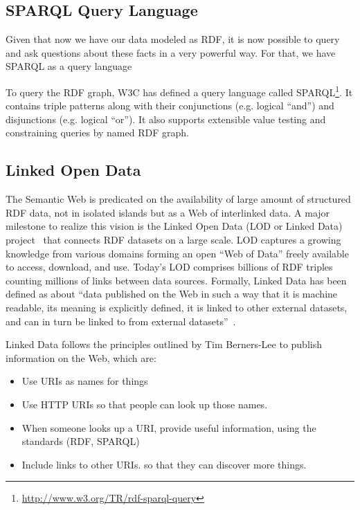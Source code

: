 \subsection{SPARQL Query Language}

Given that now we have our data modeled as RDF, it is now possible to query and ask questions about these facts in a very powerful way. For that, we have SPARQL as a query language

To query the RDF graph, W3C has defined a query language called SPARQL\footnote{\url{http://www.w3.org/TR/rdf-sparql-query}}. It contains triple patterns along with their conjunctions (e.g. logical ``and'') and disjunctions (e.g. logical ``or''). It also supports extensible value testing and constraining queries by named RDF graph.


\subsection{Linked Open Data}

The Semantic Web is predicated on the availability of large amount of structured RDF data, not in isolated islands but as a Web of interlinked data. A major milestone to realize this vision is the Linked Open Data (LOD or Linked Data) project~\cite{LOD:2011} that connects RDF datasets on a large scale. LOD captures a growing knowledge from various domains forming an open ``Web of Data'' freely available to access, download, and use. Today's LOD comprises billions of RDF triples counting millions of links between data sources. Formally, Linked Data has been defined as about ``data published on the Web in such a way that it is machine readable, its meaning is explicitly defined, it is linked to other external datasets, and can in turn be linked to from external datasets''~\cite{Bizer:HB09}.

Linked Data follows the principles outlined by Tim Berners-Lee to publish information on the Web, which are:

\begin{itemize}
\item Use URIs as names for things
\item Use HTTP URIs so that people can look up those names.
\item When someone looks up a URI, provide useful information, using the standards (RDF, SPARQL)
\item Include links to other URIs. so that they can discover more things.
\end{itemize}

